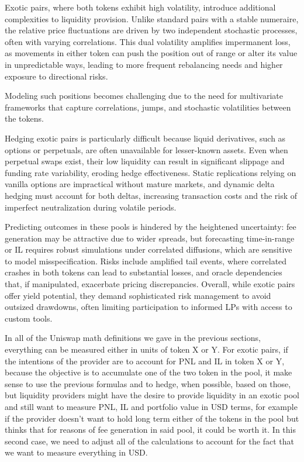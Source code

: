 \documentclass{article}
\begin{document}
Exotic pairs, where both tokens exhibit high volatility, introduce additional complexities to liquidity provision. Unlike standard pairs with a stable numeraire, the relative price fluctuations are driven by two independent stochastic processes, often with varying correlations. This dual volatility amplifies impermanent loss, as movements in either token can push the position out of range or alter its value in unpredictable ways, leading to more frequent rebalancing needs and higher exposure to directional risks.

Modeling such positions becomes challenging due to the need for multivariate frameworks that capture correlations, jumps, and stochastic volatilities between the tokens. 

Hedging exotic pairs is particularly difficult because liquid derivatives, such as options or perpetuals, are often unavailable for lesser-known assets. Even when perpetual swaps exist, their low liquidity can result in significant slippage and funding rate variability, eroding hedge effectiveness. Static replications relying on vanilla options are impractical without mature markets, and dynamic delta hedging must account for both deltas, increasing transaction costs and the risk of imperfect neutralization during volatile periods.

Predicting outcomes in these pools is hindered by the heightened uncertainty: fee generation may be attractive due to wider spreads, but forecasting time-in-range or IL requires robust simulations under correlated diffusions, which are sensitive to model misspecification. Risks include amplified tail events, where correlated crashes in both tokens can lead to substantial losses, and oracle dependencies that, if manipulated, exacerbate pricing discrepancies. Overall, while exotic pairs offer yield potential, they demand sophisticated risk management to avoid outsized drawdowns, often limiting participation to informed LPs with access to custom tools.

In all of the Uniswap math definitions we gave in the previous sections, everything can be measured either in units of token X or Y.
For exotic pairs, if the intentions of the provider are to account for PNL and IL in token X or Y, because the objective is to accumulate one of the two token in the pool, it make sense to use the previous formulas and to hedge, when possible, based on those, but liquidity providers might have the desire to provide liquidity in an exotic pool and still want to measure PNL, IL and portfolio value in USD terms, for example if the provider doesn't want to hold long term either of the tokens in the pool but thinks that for reasons of fee generation in said pool, it could be worth it. 
In this second case, we need to adjust all of the calculations to account for the fact that we want to measure everything in USD.
\end{document}
